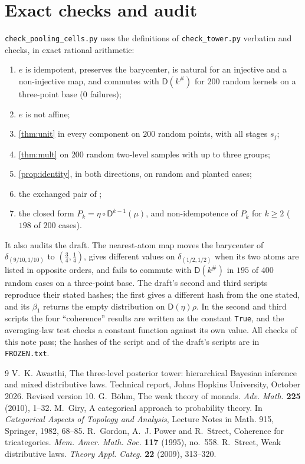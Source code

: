 \documentclass[11pt]{article}
\theoremstyle{definition}
\newcommand{\D}{\mathsf D}
\begin{document}
\section{Exact checks and audit}\label{sec:audit}
\texttt{check\_pooling\_cells.py} uses the definitions of \texttt{check\_tower.py} verbatim and checks, in exact rational arithmetic:
\begin{enumerate}[label=P\arabic*,leftmargin=*,nosep]
\item $e$ is idempotent, preserves the barycenter, is natural for an injective and a non-injective map, and commutes with $\D(k^\#)$ for
  $200$ random kernels on a three-point base ($0$ failures);
\item $e$ is not affine;
\item \cref{thm:unit} in every component on $200$ random points, with all stages $s_j$;
\item \cref{thm:mult} on $200$ random two-level samples with up to three groups;
\item \cref{prop:identity}, in both directions, on random and planted cases;
\item the exchanged pair of \cite[Prop.~13.17]{Tower};
\item the closed form $P_k=\eta\circ\D^{k-1}(\mu)$, and non-idempotence of $P_k$ for $k\ge2$ ($198$ of $200$ cases).
\end{enumerate}
It also audits the draft. The nearest-atom map moves the barycenter of $\delta_{(9/10,1/10)}$ to $(\tfrac34,\tfrac14)$, gives different
values on $\delta_{(1/2,1/2)}$ when its two atoms are listed in opposite orders, and fails to commute with $\D(k^\#)$ in $195$ of $400$ random
cases on a three-point base. The draft's second and third scripts reproduce their stated hashes; the first gives a different hash from
the one stated, and its $\beta_1$ returns the empty distribution on $\D(\eta)\rho$. In the second and third scripts the four ``coherence''
results are written as the constant \texttt{True}, and the averaging-law test checks a constant function against its own value. All
checks of this note pass; the hashes of the script and of the draft's scripts are in \texttt{FROZEN.txt}.

\begin{thebibliography}{9}
 V.~K. Awasthi, The three-level posterior tower: hierarchical Bayesian inference and mixed distributive laws.
Technical report, Johns Hopkins University, October 2026. Revised version 10.
 G.~B\"ohm, The weak theory of monads. \emph{Adv. Math.} \textbf{225} (2010), 1--32.
 M.~Giry, A categorical approach to probability theory. In \emph{Categorical Aspects of Topology and Analysis},
Lecture Notes in Math. 915, Springer, 1982, 68--85.
 R.~Gordon, A.~J. Power and R.~Street, Coherence for tricategories. \emph{Mem. Amer. Math. Soc.}
\textbf{117} (1995), no.~558.
 R.~Street, Weak distributive laws. \emph{Theory Appl. Categ.} \textbf{22} (2009), 313--320.
\end{thebibliography}
\end{document}
